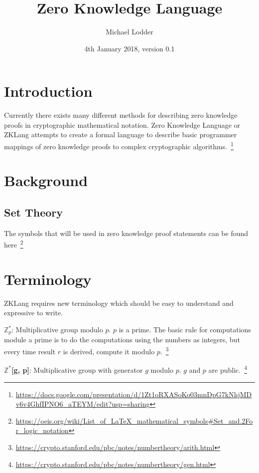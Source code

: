 \documentclass[a4paper]{article}
\title{Zero Knowledge Language}
\author{Michael Lodder}
\date{4th January 2018, version 0.1}
\begin{document}
\maketitle

\section{Introduction}

Currently there exists many different methods for describing zero knowledge proofs in cryptographic mathematical notation. Zero Knowledge Language or ZKLang attempts to create a formal language to describe basic programmer mappings of zero knowledge proofs to complex cryptographic algorithms.~\footnote{\url{https://docs.google.com/presentation/d/1Zt1oRXASoKo03mnDpG7kNhjMDv6v4GhfIPNO6_aTEYM/edit?usp=sharing}}

\section{Background}

\subsection{Set Theory}

The symbols that will be used in zero knowledge proof statements can be found here~\footnote{\url{https://oeis.org/wiki/List_of_LaTeX_mathematical_symbols\#Set_and.2For_logic_notation}}

\section{Terminology}

ZKLang requires new terminology which should be easy to understand and expressive to write.\newline

\indent $\mathbb{Z}_p^{*}$: Multiplicative group modulo $p$. $p$ is a prime. The basic rule for computations module a prime is to do the computations using the numbers as integers, but every time result $r$ is derived, compute it modulo $p$.~\footnote{\url{https://crypto.stanford.edu/pbc/notes/numbertheory/arith.html}}\newline

$\mathbb{Z^*}$\textbf{[g, p]}: Multiplicative group with generator $g$ modulo $p$. $g$ and $p$ are public.~\footnote{\url{https://crypto.stanford.edu/pbc/notes/numbertheory/gen.html}}\newline
\end{document}
